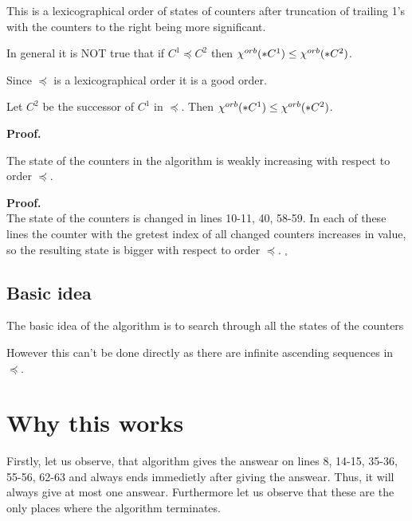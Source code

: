 This is a lexicographical order 
of states of counters after truncation of trailing 1's 
with the counters to the right being more significant. 

\begin{observation}
In general it is NOT true that if $C^1 \preceq C^2$ then 
${\chi^{orb}(*C^1)} \leq {\chi^{orb}(*C^2)}$.
\end{observation}

\begin{observation}
Since $\preceq$ is a lexicographical order it is a good order. 
\end{observation}

\begin{observation}
Let $C^2$ be the successor of $C^1$ in $\preceq$. Then ${\chi^{orb}(*C^1)} \leq {\chi^{orb}(*C^2)}$.
\end{observation}
\textbf{Proof.}


\begin{lemma}
The state of the counters in the algorithm is weakly increasing with respect to order $\preceq$. 
\end{lemma}
\textbf{Proof.} \\
The state of the counters is changed in lines 10-11, 40, 58-59. In each of these lines 
the counter with the gretest index of all changed counters increases in value, so 
the resulting state is bigger with respect to order $\preceq$. $_\square$

\subsection{Basic idea}
The basic idea of the algorithm is to search through all the states of the counters  

However this can't be done directly as there are infinite ascending sequences in $\preceq$. 
\subsection{}
 
\section{Why this works}
Firstly, let us observe, that algorithm gives the answear on lines 8, 14-15, 35-36, 55-56, 
62-63 and 
always ends immedietly after giving the answear. Thus, it will always give at most one answear.
Furthermore let us observe that these are the only places where the algorithm terminates.
 
